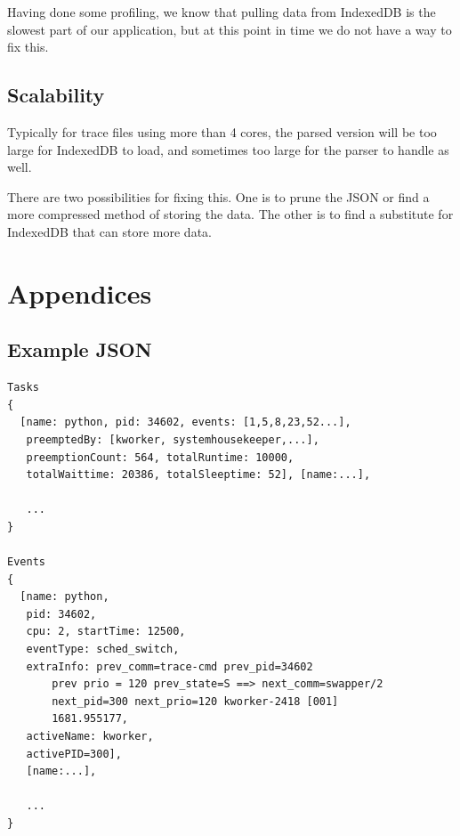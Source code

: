 \documentclass{hmcclinic}
\begin{document}
Having done some profiling, we know that pulling data from IndexedDB is the
slowest part of our application, but at this point in time we do not have a way
to fix this.

\section{Scalability}
Typically for trace files using more than 4
cores, the parsed version will be too large for IndexedDB to load, and
sometimes too large for the parser to handle as well.

There are two possibilities for fixing this. One is to prune the JSON or
find a more compressed method of storing the data. The other is to find a
substitute for IndexedDB that can store more data.

\chapter{Appendices}
\newpage
\appendix
\renewcommand{\thesection}{\Alph{section}}
\section{Example JSON} \label{App:AppendixA}

\begin{verbatim}
Tasks
{
  [name: python, pid: 34602, events: [1,5,8,23,52...], 
   preemptedBy: [kworker, systemhousekeeper,...], 
   preemptionCount: 564, totalRuntime: 10000,
   totalWaittime: 20386, totalSleeptime: 52], [name:...],

   ...   
}

Events
{
  [name: python, 
   pid: 34602, 
   cpu: 2, startTime: 12500, 
   eventType: sched_switch,
   extraInfo: prev_comm=trace-cmd prev_pid=34602 
       prev prio = 120 prev_state=S ==> next_comm=swapper/2 
       next_pid=300 next_prio=120 kworker-2418 [001]
       1681.955177, 
   activeName: kworker, 
   activePID=300], 
   [name:...], 

   ...
}
\end{verbatim}
\newpage

\newpage
\end{document}
